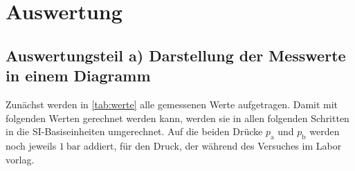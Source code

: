 \section{Auswertung}
\label{sec:Auswertung}



\subsection{Auswertungsteil a) Darstellung der Messwerte in einem Diagramm}
\label{ssec:a}
Zunächst werden in \autoref{tab:werte} alle gemessenen Werte aufgetragen. 
Damit mit folgenden Werten gerechnet werden kann, werden sie in allen folgenden Schritten in die SI-Basiseinheiten umgerechnet. 
Auf die beiden Drücke $p_\text{a}$ und $p_\text{b}$ werden noch jeweils $\SI{1}{\bar}$ addiert, für den Druck, der während des Versuches im Labor vorlag.

